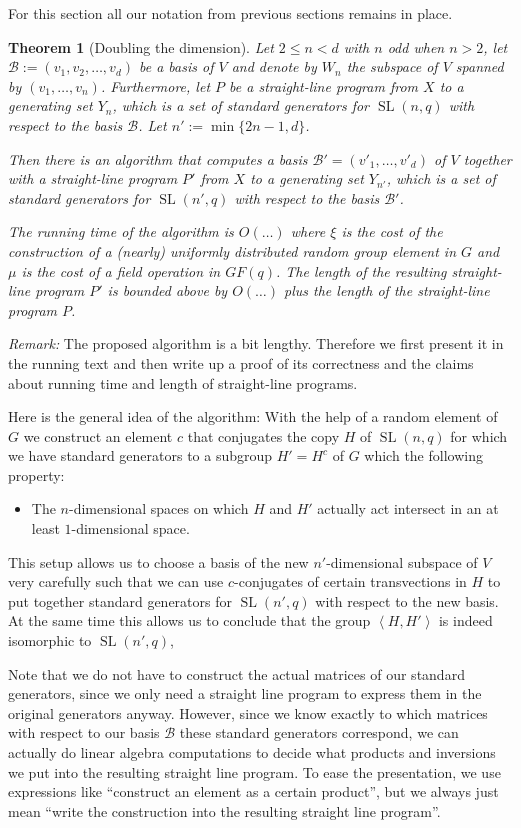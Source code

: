 \documentclass[a4paper,11pt]{article}
\def\SL{\operatorname{SL}}
\newcommand{\B}{\mathcal{B}}
\newtheorem{theorem}{Theorem}
\begin{document}
For this section all our notation from previous sections remains in place.

\begin{theorem}[Doubling the dimension]
\label{double}
Let $2 \le n < d$ with $n$ odd when $n > 2$, 
let $\B := (v_1, v_2, \ldots, v_d)$ be a basis of $V$
and denote by $W_n$ the subspace of $V$ spanned by $(v_1, \ldots, v_n)$. 
Furthermore, let $P$ be a straight-line program
from $X$ to a generating set $Y_n$, which is a set of standard
generators for $\SL(n,q)$ with respect to the basis $\B$.
Let $n' := \min\{ 2n-1, d\}$.

Then there is an algorithm that computes a basis $\B' = (v'_1, \ldots,
v'_d)$ of $V$ together with a straight-line program $P'$ from $X$
to a generating set $Y_{n'}$, which is a set of standard generators
for $\SL(n',q)$ with respect to the basis $\B'$.

The running time of the algorithm is $O(\ldots)$ where $\xi$ is the
cost of the construction of a (nearly) uniformly distributed random
group element in $G$ and $\mu$ is the cost of a field operation in
$GF(q)$. The length of the resulting straight-line program $P'$ is
bounded above by $O(\ldots)$ plus the length of the straight-line
program $P$.
\end{theorem}

\emph{Remark:} The proposed algorithm is a bit lengthy. Therefore
we first present it in the running text and then write up a proof of its
correctness and the claims about running time and length of
straight-line programs.

\smallskip
Here is the general idea of the algorithm: With the help of a random 
element of $G$ we construct an element $c$ that conjugates the copy $H$
of $\SL(n,q)$ for which we have standard generators to a subgroup $H'=H^c$ of
$G$ which the following property:
\begin{itemize}
\item The $n$-dimensional spaces on which $H$ and $H'$ actually act 
intersect in an at least $1$-dimensional space.
\end{itemize}
This setup allows us to choose a basis of the new $n'$-dimensional
subspace of $V$ very carefully such that we can use $c$-conjugates of certain
transvections in $H$ to put together standard generators for $\SL(n',q)$
with respect to the new basis. At the same time this allows us to conclude 
that the group $\left<H,H'\right>$ is indeed isomorphic to $\SL(n',q)$,

Note that we do not have to construct the actual matrices of our standard
generators, since we only need a straight line program to express them in the
original generators anyway. However, since we know exactly to which
matrices with respect to our basis $\B$ these standard generators correspond,
we can actually do linear algebra computations to decide what products
and inversions we put into the resulting straight line program.
To ease the presentation, we use expressions like ``construct an element
as a certain product'', but we always just mean ``write the construction
into the resulting straight line program''.
\end{document}
